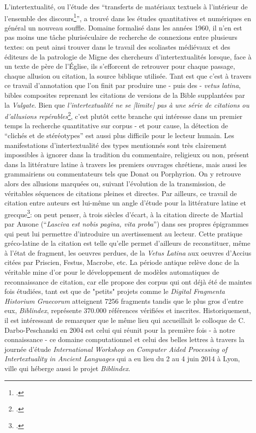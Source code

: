 L'intertextualité, ou l'étude des \enquote{transferts de matériaux textuels à l'intérieur de l'ensemble des discours\footcite{aron_intertextualite_2010}}, a trouvé dans les études quantitatives et numériques en général un nouveau souffle. Domaine formalisé dans les années 1960, il n'en est pas moins une tâche pluriséculaire de recherche de connexions entre plusieurs textes: on peut ainsi trouver dans le travail des scoliastes médiévaux et des éditeurs de la patrologie de Migne des chercheurs d'intertextualités lorsque, face à un texte de père de l'Église, ils s'efforcent de retrouver pour chaque passage, chaque allusion ou citation, la source biblique utilisée. Tant est que c'est à travers ce travail d'annotation que l'on finit par produire une - puis des - \textit{vetus latina}, bibles composites reprenant les citations de versions de la Bible supplantées par la \textit{Vulgate}. Bien que \textit{l'intertextualité ne se [limite] pas à une série de citations ou d'allusions repérables}\footcite{aron_intertextualite_2010}, c'est plutôt cette branche qui intéresse dans un premier temps la recherche quantitative sur corpus - et pour cause, la détection de \enquote{clichés et de stéréotypes} est aussi plus difficile pour le lecteur humain. Les manifestations d'intertextualité des types mentionnés sont très clairement impossibles à ignorer dans la tradition du commentaire, religieux ou non, présent dans la littérature latine à travers les premiers ouvrages chrétiens, mais aussi les grammairiens ou commentateurs tels que Donat ou Porphyrion. On y retrouve alors des allusions marquées ou, suivant l'évolution de la transmission, de véritables séquences de citations pleines et directes. Par ailleurs, ce travail de citation entre auteurs est lui-même un angle d'étude pour la littérature latine et grecque\footcite{darbo-peschanski_citation_2004}: on peut penser, à trois siècles d'écart, à la citation directe de Martial par Ausone (\enquote{\textit{Lasciva est nobis pagina, vita proba}}) dans ses propres épigrammes qui peut lui permettre d'introduire un avertissement au lecteur. Cette pratique gréco-latine de la citation est telle qu'elle permet d'ailleurs de reconstituer, même à l'état de fragment, les oeuvres perdues, de la \textit{Vetus Latina} aux oeuvres d'Accius citées par Priscien, Festus, Macrobe, etc. La période antique relève donc de la véritable mine d'or pour le développement de modèles automatiques de reconnaissance de citation, car elle propose des corpus qui ont déjà été de maintes fois étudiées, tant est que de "petits" projets comme le \textit{Digital Fragmenta Historium Graecorum} atteignent 7256 fragments tandis que le plus gros d'entre eux, \textit{Biblindex}, représente 370.000 références vérifiées et inscrites. Historiquement, il est intéressant de remarquer que le même lieu qui accueillait le colloque de C.  Darbo-Peschanski en 2004 est celui qui réunit pour la première fois - à notre connaissance - ce domaine computationnel et celui des belles lettres à travers la journée d'étude \textit{International Workshop on Computer Aided Processing of Intertextuality in Ancient Languages} qui a eu lieu du 2 au 4 juin 2014 à Lyon, ville qui héberge aussi le projet \textit{Biblindex}.


